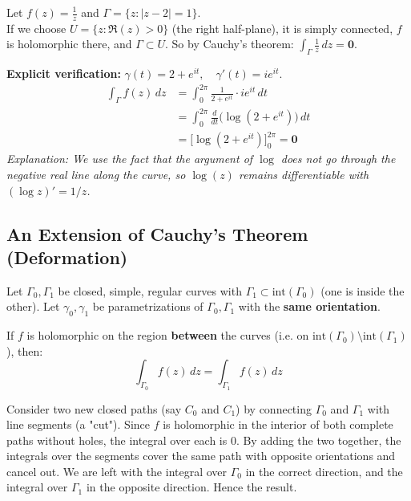 \begin{example}
Let $f(z) = \frac{1}{z}$ and $\Gamma = \{ z : |z - 2| = 1 \}$.\\
If we choose $U = \{ z : \Re(z) > 0 \}$ (the right half-plane), it is simply connected, $f$ is holomorphic there, and $\Gamma \subset U$. So by Cauchy's theorem: $\int_{\Gamma} \frac{1}{z} \, dz = \mathbf{0}$.

\textbf{Explicit verification:} $\gamma(t) = 2 + e^{it}, \quad \gamma'(t) = i e^{it}$.
\begin{align*}
\int_{\Gamma} f(z) \, dz &= \int_0^{2\pi} \frac{1}{2 + e^{it}} \cdot i e^{it} \, dt \\
&= \int_0^{2\pi} \frac{d}{dt} \Big(\log(2 + e^{it})\Big) \, dt \\
&= \Big[ \log(2 + e^{it}) \Big]_0^{2\pi} = \mathbf{0}
\end{align*}
\textit{Explanation: We use the fact that the argument of $\log$ does not go through the negative real line along the curve, so $\log(z)$ remains differentiable with $(\log z)' = 1/z$.}
\end{example}

\subsection{An Extension of Cauchy's Theorem (Deformation)}

\begin{theorem}
Let $\Gamma_0, \Gamma_1$ be closed, simple, regular curves with $\Gamma_1 \subset \text{int}(\Gamma_0)$ (one is inside the other). Let $\gamma_0, \gamma_1$ be parametrizations of $\Gamma_0, \Gamma_1$ with the \textbf{same orientation}.

If $f$ is holomorphic on the region \textbf{between} the curves (i.e. on $\text{int}(\Gamma_0) \setminus \text{int}(\Gamma_1)$), then:
\[
\int_{\Gamma_0} f(z) \, dz = \int_{\Gamma_1} f(z) \, dz
\]
\end{theorem}

\begin{proofbox}
Consider two new closed paths (say $C_0$ and $C_1$) by connecting $\Gamma_0$ and $\Gamma_1$ with line segments (a "cut"). Since $f$ is holomorphic in the interior of both complete paths without holes, the integral over each is $0$.
By adding the two together, the integrals over the segments cover the same path with opposite orientations and cancel out. We are left with the integral over $\Gamma_0$ in the correct direction, and the integral over $\Gamma_1$ in the opposite direction. Hence the result.
\end{proofbox}

